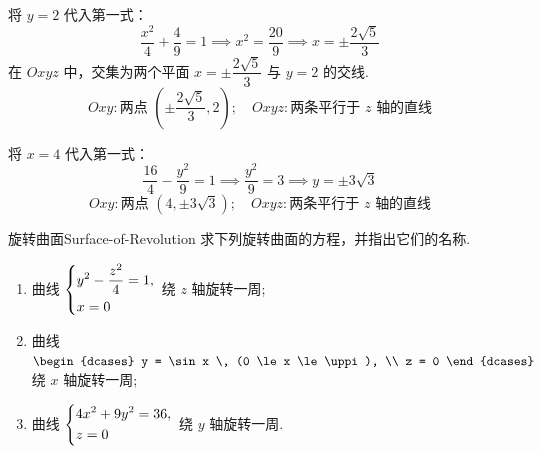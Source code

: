 \begin{solution}

    将 $y=2$ 代入第一式：
    \begin{equation}
        \dfrac{x^2}{4} + \dfrac{4}{9} = 1 \implies x^2 = \dfrac{20}{9} \implies x = \pm \dfrac{2\sqrt{5}}{3}
    \end{equation}
    在 $Oxyz$ 中，交集为两个平面 $x = \pm \dfrac{2\sqrt{5}}{3}$ 与 $y=2$ 的交线.
    \begin{equation}
        \boxed{Oxy: \text{两点 } \left( \pm \dfrac{2\sqrt{5}}{3}, 2 \right); \quad Oxyz: \text{两条平行于 } z \text{ 轴的直线}}
    \end{equation}


    将 $x=4$ 代入第一式：
    \begin{equation}
        \dfrac{16}{4} - \dfrac{y^2}{9} = 1 \implies \dfrac{y^2}{9} = 3 \implies y = \pm 3\sqrt{3}
    \end{equation}
    \begin{equation}
        \boxed{Oxy: \text{两点 } (4, \pm 3\sqrt{3}); \quad Oxyz: \text{两条平行于 } z \text{ 轴的直线}}
    \end{equation}
\end{solution}


\begin{problem}{旋转曲面}{Surface-of-Revolution}
    求下列旋转曲面的方程，并指出它们的名称.
    \begin{enumerate}
        \item 曲线 $\begin{dcases} y^2 - \frac{z^2}{4} = 1, \\ x = 0 \end{dcases}$ 绕 $z$ 轴旋转一周;
        \item 曲线 $\begin{dcases} y = \sin x \, (0 \le x \le \uppi), \\ z = 0 \end{dcases}$ 绕 $x$ 轴旋转一周;
        \item 曲线 $\begin{dcases} 4x^2 + 9y^2 = 36, \\ z = 0 \end{dcases}$ 绕 $y$ 轴旋转一周.
    \end{enumerate}
\end{problem}

